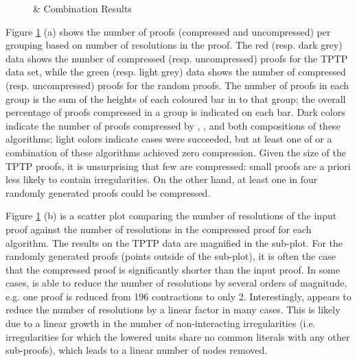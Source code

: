 {\begin{figure}[p]
 \caption{\GFOLU \& \FORPI Combination Results}
\label{fig:ex}

\end{figure}

Figure \ref{fig:ex} (a) shows the number of proofs (compressed and uncompressed) per grouping based on number of resolutions in the proof. The red (resp. dark grey) data shows the number of compressed (resp. uncompressed) proofs for the TPTP data set, while the green (resp. light grey) data shows the number of compressed (resp. uncompressed) proofs for the random proofs. The number of proofs in each group is the sum of the heights of each coloured bar in to that group; the overall percentage of proofs compressed in a group is indicated on each bar. Dark colors indicate the number of proofs compressed by {\FORPI}, {\GFOLU}, and both compositions of these algorithms; light colors indicate cases were {\FORPI} succeeded, but at least one of {\GFOLU} or a combination of these algorithms achieved zero compression. 
Given the size of the TPTP proofs, it is unsurprising that few are compressed: small proofs are a priori less likely to contain irregularities. On the other hand, at least one in four randomly generated proofs could be compressed. 

Figure \ref{fig:ex} (b) is a scatter plot comparing the number of resolutions of the input proof against the number of resolutions in the compressed proof for each algorithm. The results on the TPTP data are magnified in the sub-plot. For the randomly generated proofs (points outside of the sub-plot), it is often the case that the compressed proof is significantly shorter than the input proof. In some cases, {\FORPI} is able to reduce the number of resolutions by several orders of magnitude, e.g. one proof is reduced from 196 contractions to only 2. Interestingly, {\GFOLU} appears to reduce the number of resolutions by a linear factor in many cases. This is likely due to a linear growth in the number of non-interacting irregularities (i.e. irregularities for which the lowered units share no common literals with any other sub-proofs), which leads to a linear number of nodes removed.

}
